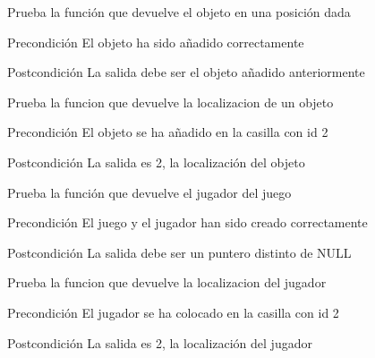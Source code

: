\begin{DoxyRefList}
\item[\label{test__test000092}%
\hypertarget{test__test000092}{}%
Global \hyperlink{game__test_8c_a216843bef0a0a9443c3feb3671b51f6f}{test1\-\_\-game\-\_\-get\-\_\-object\-\_\-at} ()]Prueba la función que devuelve el objeto en una posición dada \begin{DoxyPrecond}{Precondición}
El objeto ha sido añadido correctamente 
\end{DoxyPrecond}
\begin{DoxyPostcond}{Postcondición}
La salida debe ser el objeto añadido anteriormente  
\end{DoxyPostcond}

\item[\label{test__test000108}%
\hypertarget{test__test000108}{}%
Global \hyperlink{game__test_8c_aff63179aad895eeb2f2d5571156fd387}{test1\-\_\-game\-\_\-get\-\_\-object\-\_\-location} ()]Prueba la funcion que devuelve la localizacion de un objeto \begin{DoxyPrecond}{Precondición}
El objeto se ha añadido en la casilla con id 2 
\end{DoxyPrecond}
\begin{DoxyPostcond}{Postcondición}
La salida es 2, la localización del objeto  
\end{DoxyPostcond}

\item[\label{test__test000097}%
\hypertarget{test__test000097}{}%
Global \hyperlink{game__test_8c_a867c32166bda065e0c64a4a7c8e7b6d8}{test1\-\_\-game\-\_\-get\-\_\-player} ()]Prueba la función que devuelve el jugador del juego \begin{DoxyPrecond}{Precondición}
El juego y el jugador han sido creado correctamente 
\end{DoxyPrecond}
\begin{DoxyPostcond}{Postcondición}
La salida debe ser un puntero distinto de N\-U\-L\-L  
\end{DoxyPostcond}

\item[\label{test__test000106}%
\hypertarget{test__test000106}{}%
Global \hyperlink{game__test_8c_aa387108e95dba4762d0f2cbfdbf30cd3}{test1\-\_\-game\-\_\-get\-\_\-player\-\_\-location} ()]Prueba la funcion que devuelve la localizacion del jugador \begin{DoxyPrecond}{Precondición}
El jugador se ha colocado en la casilla con id 2 
\end{DoxyPrecond}
\begin{DoxyPostcond}{Postcondición}
La salida es 2, la localización del jugador  
\end{DoxyPostcond}


\end{DoxyRefList}
